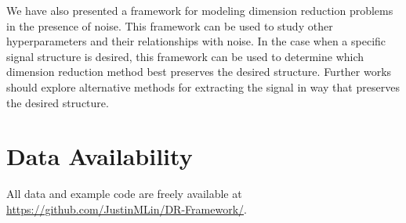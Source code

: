 \documentclass[webpdf,modern,large,namedate]{oup-authoring-template}
\theoremstyle{thmstyleone}%
\theoremstyle{thmstyletwo}%
\theoremstyle{thmstylethree}%
\begin{document}
We have also presented a framework for modeling dimension reduction problems in the presence of noise. This framework can be used to study other hyperparameters and their relationships with noise. In the case when a specific signal structure is desired, this framework can be used to determine which dimension reduction method best preserves the desired structure. Further works should explore alternative methods for extracting the signal in way that preserves the desired structure.

\section{Data Availability}
All data and example code are freely available at \url{https://github.com/JustinMLin/DR-Framework/}.



\end{document}
